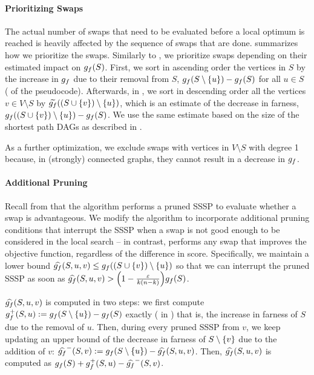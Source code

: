 

\paragraph{Prioritizing Swaps}
%
The actual number of swaps that need to be evaluated before a local optimum is
reached is heavily affected by the sequence of swaps that are done.
 summarizes how we prioritize the swaps. Similarly to
\growshrink, we prioritize swaps depending on their estimated impact on
$g_f(S)$. First, we sort in ascending order the vertices in $S$ by
the increase in $g_f$ due to their removal from $S$, \ie
$\gfarn(S\setminus \set{u}) - \gfarn(S)$ for all $u \in S$
( of the pseudocode).
Afterwards, in , we
sort in descending order all the vertices $v \in V \setminus S$ by
$\gfarnapx((S \cup \set{v}) \setminus \set{u})$, which is an estimate of the
decrease in farness, \ie $\gfarn((S \cup \set{v}) \setminus \set{u}) -
\gfarn(S)$.
We use the same estimate based on the size of the shortest path DAGs as described
in .

As a further optimization, we exclude swaps with vertices in $V \setminus S$ with
degree 1 because, in (strongly) connected graphs, they cannot result in a decrease
in $g_f$.

\paragraph{Additional Pruning}
%
Recall from  that the \growshrink algorithm performs
a pruned SSSP to evaluate whether a swap is advantageous. We modify the algorithm
to incorporate additional pruning conditions that interrupt the SSSP when a swap
is not good enough to be considered in the local search -- in contrast, \growshrink
performs any swap that improves the objective function, regardless of the difference
in score. Specifically, we maintain a lower bound
$\gfarnupp(S, u, v) \le \gfarn((S \cup \set{v}) \setminus \set{u})$ so that we can
interrupt the pruned SSSP as soon as
$\gfarnupp(S, u, v) > \roundb{1 - \frac{\epsilon}{k (n - k)}}\gfarn(S)$.

$\widehat{g_f}(S, u, v)$ is computed in two steps: we first compute
$\gfarn^+(S, u) := \gfarn(S \setminus \set{u}) - \gfarn(S)$ exactly (
in ) that is, the increase in farness of $S$ due to the
removal of $u$. Then, during every pruned SSSP from $v$, we keep updating an upper bound
of the decrease in farness of $S \setminus \set{v}$ due to the addition of $v$:
$\gfarnupp^-(S, v) := \gfarn(S \setminus \set{u}) - \gfarnupp(S, u, v)$.
Then, $\widehat{g_f}(S, u, v)$ is computed as $g_f(S) + g_f^+(S, u) - \widehat{g_f}^-(S, v)$.

